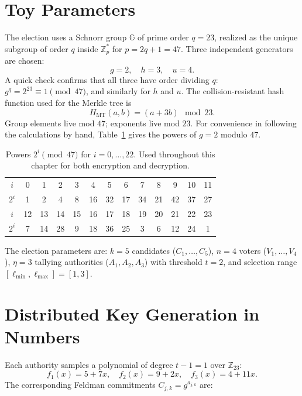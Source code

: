 \documentclass[12pt,a4paper,oneside]{report}
\begin{document}
\section{Toy Parameters}
\label{sec:byhand-params}

The election uses a Schnorr group $\mathbb{G}$ of prime order $q = 23$, 
realized as the unique subgroup of order $q$ inside $\mathbb{Z}_p^*$ for 
$p = 2q + 1 = 47$. Three independent generators are chosen:
\[
    g = 2, \quad h = 3, \quad u = 4.
\]
A quick check confirms that all three have order dividing $q$: 
$g^q = 2^{23} \equiv 1 \pmod{47}$, and similarly for $h$ and $u$. The 
collision-resistant hash function used for the Merkle tree is
\[
    H_{\text{MT}}(a, b) = (a + 3b) \mod 23.
\]
Group elements live mod $47$; exponents live mod $23$. For convenience 
in following the calculations by hand, Table~\ref{tab:byhand-powers} 
gives the powers of $g = 2$ modulo $47$.

\begin{table}[H]
\centering
\caption{Powers $2^i \pmod{47}$ for $i = 0, \ldots, 22$. Used throughout 
this chapter for both encryption and decryption.}
\label{tab:byhand-powers}
\small
\begin{tabular}{c|cccccccccccc}
\toprule
$i$ & 0 & 1 & 2 & 3 & 4 & 5 & 6 & 7 & 8 & 9 & 10 & 11 \\
$2^i$ & 1 & 2 & 4 & 8 & 16 & 32 & 17 & 34 & 21 & 42 & 37 & 27 \\
\midrule
$i$ & 12 & 13 & 14 & 15 & 16 & 17 & 18 & 19 & 20 & 21 & 22 & 23 \\
$2^i$ & 7 & 14 & 28 & 9 & 18 & 36 & 25 & 3 & 6 & 12 & 24 & 1 \\
\bottomrule
\end{tabular}
\end{table}

The election parameters are: $k = 5$ candidates ($C_1, \ldots, C_5$), 
$n = 4$ voters ($V_1, \ldots, V_4$), $\eta = 3$ tallying authorities 
($A_1, A_2, A_3$) with threshold $t = 2$, and selection range 
$[\ell_{\min}, \ell_{\max}] = [1, 3]$.

\section{Distributed Key Generation in Numbers}
\label{sec:byhand-dkg}

Each authority samples a polynomial of degree $t - 1 = 1$ over 
$\mathbb{Z}_{23}$:
\[
    f_1(x) = 5 + 7x, \quad f_2(x) = 9 + 2x, \quad f_3(x) = 4 + 11x.
\]
The corresponding Feldman commitments $C_{j, k} = g^{a_{j, k}}$ are:
\end{document}
